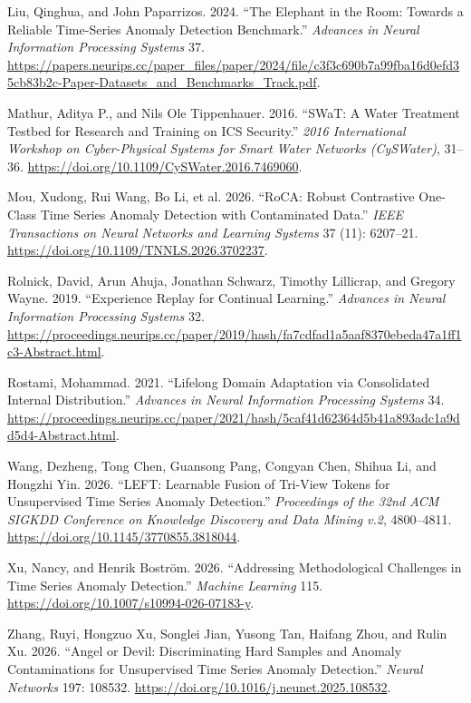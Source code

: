 \documentclass[
  american,
]{article}
\newlength{\cslhangindent}
\newenvironment{CSLReferences}[2] %
 {\begin{list}{}{%
  \setlength{\itemindent}{0pt}
  \setlength{\leftmargin}{0pt}
  \setlength{\parsep}{0pt}
  \ifodd #1
   \setlength{\leftmargin}{\cslhangindent}
   \setlength{\itemindent}{-1\cslhangindent}
  \fi
  \setlength{\itemsep}{#2\baselineskip}}}
 {\end{list}}
\begin{document}
\begin{CSLReferences}{1}{1}
Liu, Qinghua, and John Paparrizos. 2024. {``The Elephant in the Room:
Towards a Reliable Time-Series Anomaly Detection Benchmark.''}
\emph{Advances in Neural Information Processing Systems} 37.
\url{https://papers.neurips.cc/paper_files/paper/2024/file/c3f3c690b7a99fba16d0efd35cb83b2c-Paper-Datasets_and_Benchmarks_Track.pdf}.

Mathur, Aditya P., and Nils Ole Tippenhauer. 2016. {``{SWaT}: A Water
Treatment Testbed for Research and Training on {ICS} Security.''}
\emph{2016 International Workshop on Cyber-Physical Systems for Smart
Water Networks (CySWater)}, 31--36.
\url{https://doi.org/10.1109/CySWater.2016.7469060}.

Mou, Xudong, Rui Wang, Bo Li, et al. 2026. {``{RoCA}: Robust Contrastive
One-Class Time Series Anomaly Detection with Contaminated Data.''}
\emph{IEEE Transactions on Neural Networks and Learning Systems} 37
(11): 6207--21. \url{https://doi.org/10.1109/TNNLS.2026.3702237}.

Rolnick, David, Arun Ahuja, Jonathan Schwarz, Timothy Lillicrap, and
Gregory Wayne. 2019. {``Experience Replay for Continual Learning.''}
\emph{Advances in Neural Information Processing Systems} 32.
\url{https://proceedings.neurips.cc/paper/2019/hash/fa7cdfad1a5aaf8370ebeda47a1ff1c3-Abstract.html}.

Rostami, Mohammad. 2021. {``Lifelong Domain Adaptation via Consolidated
Internal Distribution.''} \emph{Advances in Neural Information
Processing Systems} 34.
\url{https://proceedings.neurips.cc/paper/2021/hash/5caf41d62364d5b41a893adc1a9dd5d4-Abstract.html}.

Wang, Dezheng, Tong Chen, Guansong Pang, Congyan Chen, Shihua Li, and
Hongzhi Yin. 2026. {``{LEFT}: Learnable Fusion of Tri-View Tokens for
Unsupervised Time Series Anomaly Detection.''} \emph{Proceedings of the
32nd ACM SIGKDD Conference on Knowledge Discovery and Data Mining v.2},
4800--4811. \url{https://doi.org/10.1145/3770855.3818044}.

Xu, Nancy, and Henrik Boström. 2026. {``Addressing Methodological
Challenges in Time Series Anomaly Detection.''} \emph{Machine Learning}
115. \url{https://doi.org/10.1007/s10994-026-07183-y}.

Zhang, Ruyi, Hongzuo Xu, Songlei Jian, Yusong Tan, Haifang Zhou, and
Rulin Xu. 2026. {``Angel or Devil: Discriminating Hard Samples and
Anomaly Contaminations for Unsupervised Time Series Anomaly
Detection.''} \emph{Neural Networks} 197: 108532.
\url{https://doi.org/10.1016/j.neunet.2025.108532}.

\end{CSLReferences}
\end{document}
